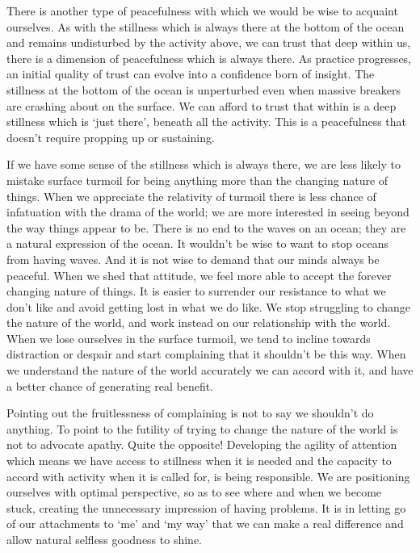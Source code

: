 There is another type of peacefulness with which we would be wise to
acquaint ourselves. As with the stillness which is always there at the
bottom of the ocean and remains undisturbed by the activity above, we
can trust that deep within us, there is a dimension of peacefulness
which is always there. As practice progresses, an initial quality of
trust can evolve into a confidence born of insight. The stillness at the
bottom of the ocean is unperturbed even when massive breakers are
crashing about on the surface. We can afford to trust that
within is a deep stillness which is `just there',
beneath all the activity. This is a peacefulness
that doesn’t require propping up or sustaining.

If we have some sense of the stillness which is always there, we are
less likely to mistake surface turmoil for being anything more than the
changing nature of things. When we appreciate the relativity of turmoil
there is less chance of infatuation with the drama of the world; we are
more interested in seeing beyond the way things appear to be. There is
no end to the waves on an ocean; they are a natural expression of the
ocean. It wouldn’t be wise to want to stop oceans from having waves. And
it is not wise to demand that our minds always be peaceful. When we shed
that attitude, we feel more able to accept the forever changing nature
of things. It is easier to surrender our resistance to what we don’t
like and avoid getting lost in what we do like. We stop struggling to
change the nature of the world, and work instead on our relationship
with the world. When we lose ourselves in the surface turmoil, we tend
to incline towards distraction or despair and start complaining that it
shouldn’t be this way. When we understand the nature of the world
accurately we can accord with it, and have a better chance of generating
real benefit.

Pointing out the fruitlessness of complaining is not to say we shouldn’t
do anything. To point to the futility of trying to change the nature of
the world is not to advocate apathy. Quite the opposite! Developing the
agility of attention which means we have access to stillness when it is
needed and the capacity to accord with activity when it is called for,
is being responsible. We are positioning ourselves with optimal
perspective, so as to see where and when we become stuck, creating the
unnecessary impression of having problems. It is in letting go of our
attachments to ‘me’ and ‘my way’ that we can make a real difference and
allow natural selfless goodness to shine.

